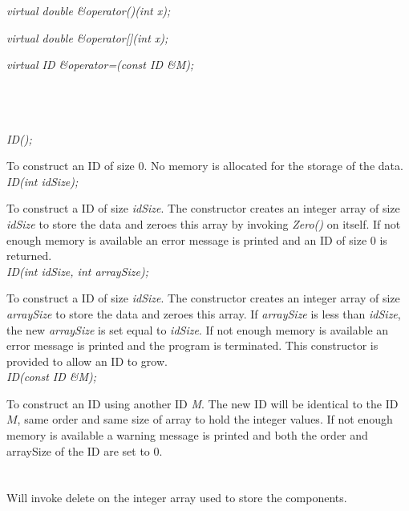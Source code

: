 {\em virtual double \&operator()(int x);} 

{\em virtual double \&operator[](int x);} 

{\em virtual ID \&operator=(const ID \&M);}

 \\  
 \\ 



  \\
{\em ID();}  

To construct an ID of size $0$. No memory is allocated for the storage
of the data. \\

{\em  ID(int idSize);}  

To construct a ID of size {\em idSize}. The constructor creates an
integer array of size {\em idSize} to store the data and zeroes this
array by invoking {\em Zero()} on itself. If not enough memory is
available an error message is printed and an ID of size $0$ is
returned. \\  

{\em  ID(int idSize, int arraySize);}  

To construct a ID of size {\em idSize}. The constructor creates an
integer array of size {\em arraySize} to store the data and zeroes
this array. If {\em arraySize} is less than {\em idSize}, the new {\em
arraySize} is set equal to {\em idSize}. If not enough memory is
available an error message is printed and the program is
terminated. This constructor is provided to allow an ID to grow. \\  

{\em  \indent  ID(const ID \&M); }  

To construct an ID using another ID {\em M}. The new ID will be
identical to the ID $M$, same order and same size of array to hold the
integer values. If not enough memory is available a
warning message is printed and both the order and arraySize of the ID
are set to $0$. \\

 \\
\\ 
Will invoke delete on the integer array used to store the components. \\


